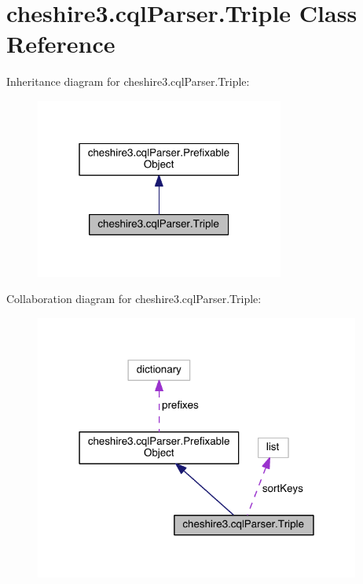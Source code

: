 \hypertarget{classcheshire3_1_1cql_parser_1_1_triple}{\section{cheshire3.\-cql\-Parser.\-Triple Class Reference}
\label{classcheshire3_1_1cql_parser_1_1_triple}
}


Inheritance diagram for cheshire3.\-cql\-Parser.\-Triple\-:
\nopagebreak
\begin{figure}[H]
\begin{center}
\leavevmode
\includegraphics[width=232pt]{classcheshire3_1_1cql_parser_1_1_triple__inherit__graph}
\end{center}
\end{figure}


Collaboration diagram for cheshire3.\-cql\-Parser.\-Triple\-:
\nopagebreak
\begin{figure}[H]
\begin{center}
\leavevmode
\includegraphics[width=303pt]{classcheshire3_1_1cql_parser_1_1_triple__coll__graph}
\end{center}
\end{figure}
